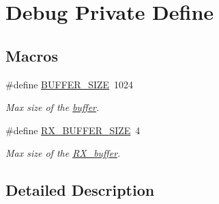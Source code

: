 \hypertarget{group___debug___private___define}{}\section{Debug Private Define}
\label{group___debug___private___define}
\subsection*{Macros}
\begin{DoxyCompactItemize}
\item 
\#define \hyperlink{group___debug___private___define_ga6b20d41d6252e9871430c242cb1a56e7}{B\+U\+F\+F\+E\+R\+\_\+\+S\+I\+ZE}~1024\hypertarget{group___debug___private___define_ga6b20d41d6252e9871430c242cb1a56e7}{}\label{group___debug___private___define_ga6b20d41d6252e9871430c242cb1a56e7}

\begin{DoxyCompactList}\small\item\em Max size of the \hyperlink{group___debug___private___variables_gacab2203504e72e5e674d3174e0bd7d5e}{buffer}. \end{DoxyCompactList}\item 
\#define \hyperlink{group___debug___private___define_ga739a2a1a0047c98ac1b18ecd25dac092}{R\+X\+\_\+\+B\+U\+F\+F\+E\+R\+\_\+\+S\+I\+ZE}~4\hypertarget{group___debug___private___define_ga739a2a1a0047c98ac1b18ecd25dac092}{}\label{group___debug___private___define_ga739a2a1a0047c98ac1b18ecd25dac092}

\begin{DoxyCompactList}\small\item\em Max size of the \hyperlink{group___debug___private___variables_ga17916f59674854b82e55fe3d39a36d81}{R\+X\+\_\+buffer}. \end{DoxyCompactList}\end{DoxyCompactItemize}


\subsection{Detailed Description}

